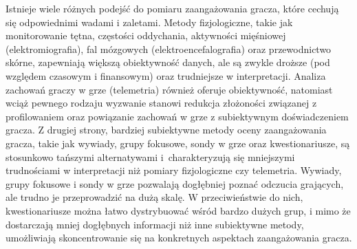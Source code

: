 Istnieje wiele różnych podejść do pomiaru zaangażowania gracza, które cechują się odpowiednimi wadami i zaletami.
Metody fizjologiczne, takie jak monitorowanie tętna, częstości oddychania, aktywności
mięśniowej (elektromiografia), fal mózgowych (elektroencefalografia) oraz przewodnictwo skórne,
zapewniają większą obiektywność danych, ale są zwykle droższe (pod względem czasowym i finansowym) oraz
trudniejsze w interpretacji\cite{validation_of_ge_scales}.
Analiza zachowań graczy w grze (telemetria) również oferuje obiektywność,
natomiast wciąż pewnego rodzaju wyzwanie stanowi redukcja złożoności związanej z
profilowaniem oraz powiązanie zachowań w grze z subiektywnym doświadczeniem gracza. Z drugiej strony,
bardziej subiektywne metody oceny zaangażowania gracza, takie jak wywiady, grupy fokusowe, sondy w grze oraz
kwestionariusze, są stosunkowo tańszymi alternatywami i~charakteryzują się mniejszymi trudnościami w
interpretacji niż pomiary fizjologiczne czy telemetria\cite{validation_of_ge_scales}.
Wywiady, grupy fokusowe i sondy w grze pozwalają dogłębniej poznać odczucia grających, ale trudno je przeprowadzić na
dużą skalę. W przeciwieństwie do nich, kwestionariusze można łatwo dystrybuować wśród bardzo dużych grup,
i mimo że dostarczają mniej dogłębnych informacji niż inne subiektywne metody, umożliwiają skoncentrowanie
się na konkretnych aspektach zaangażowania gracza\cite{validation_of_ge_scales}.

